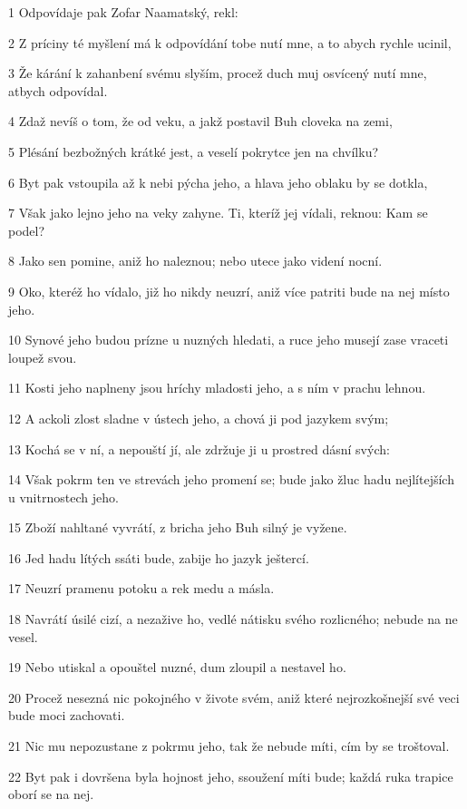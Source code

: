 \par 1 Odpovídaje pak Zofar Naamatský, rekl:
\par 2 Z príciny té myšlení má k odpovídání tobe nutí mne, a to abych rychle ucinil,
\par 3 Že kárání k zahanbení svému slyším, procež duch muj osvícený nutí mne, atbych odpovídal.
\par 4 Zdaž nevíš o tom, že od veku, a jakž postavil Buh cloveka na zemi,
\par 5 Plésání bezbožných krátké jest, a veselí pokrytce jen na chvílku?
\par 6 Byt pak vstoupila až k nebi pýcha jeho, a hlava jeho oblaku by se dotkla,
\par 7 Však jako lejno jeho na veky zahyne. Ti, kteríž jej vídali, reknou: Kam se podel?
\par 8 Jako sen pomine, aniž ho naleznou; nebo utece jako videní nocní.
\par 9 Oko, kteréž ho vídalo, již ho nikdy neuzrí, aniž více patriti bude na nej místo jeho.
\par 10 Synové jeho budou prízne u nuzných hledati, a ruce jeho musejí zase vraceti loupež svou.
\par 11 Kosti jeho naplneny jsou hríchy mladosti jeho, a s ním v prachu lehnou.
\par 12 A ackoli zlost sladne v ústech jeho, a chová ji pod jazykem svým;
\par 13 Kochá se v ní, a nepouští jí, ale zdržuje ji u prostred dásní svých:
\par 14 Však pokrm ten ve strevách jeho promení se; bude jako žluc hadu nejlítejších u vnitrnostech jeho.
\par 15 Zboží nahltané vyvrátí, z bricha jeho Buh silný je vyžene.
\par 16 Jed hadu lítých ssáti bude, zabije ho jazyk ještercí.
\par 17 Neuzrí pramenu potoku a rek medu a másla.
\par 18 Navrátí úsilé cizí, a nezažive ho, vedlé nátisku svého rozlicného; nebude na ne vesel.
\par 19 Nebo utiskal a opouštel nuzné, dum zloupil a nestavel ho.
\par 20 Procež nesezná nic pokojného v živote svém, aniž které nejrozkošnejší své veci bude moci zachovati.
\par 21 Nic mu nepozustane z pokrmu jeho, tak že nebude míti, cím by se troštoval.
\par 22 Byt pak i dovršena byla hojnost jeho, ssoužení míti bude; každá ruka trapice oborí se na nej.
